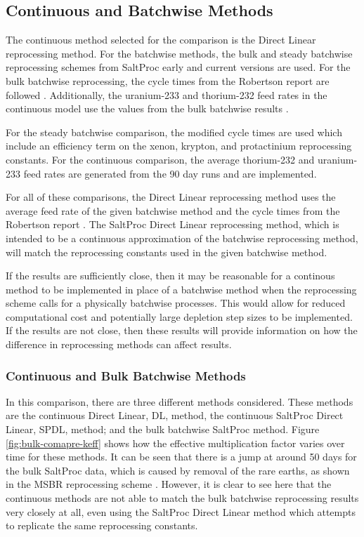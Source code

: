 \subsection{Continuous and Batchwise Methods}

The continuous method selected for the comparison is the Direct Linear reprocessing method. For the batchwise methods, the bulk and steady batchwise reprocessing schemes from SaltProc early and current versions are used. For the bulk batchwise reprocessing, the cycle times from the Robertson report are followed \cite{robertson_conceptual_1971}. Additionally, the uranium-233 and thorium-232 feed rates in the continuous model use the values from the bulk batchwise results \cite{rykhlevskii_advanced_2018}.

For the steady batchwise comparison, the modified cycle times are used which include an efficiency term on the xenon, krypton, and protactinium reprocessing constants. For the continuous comparison, the average thorium-232 and uranium-233 feed rates are generated from the 90 day runs and are implemented.

For all of these comparisons, the Direct Linear reprocessing method uses the average feed rate of the given batchwise method and the cycle times from the Robertson report \cite{robertson_conceptual_1971}. The SaltProc Direct Linear reprocessing method, which is intended to be a continuous approximation of the batchwise reprocessing method, will match the reprocessing constants used in the given batchwise method.

If the results are sufficiently close, then it may be reasonable for a continous method to be implemented in place of a batchwise method when the reprocessing scheme calls for a physically batchwise processes. This would allow for reduced computational cost and potentially large depletion step sizes to be implemented. If the results are not close, then these results will provide information on how the difference in reprocessing methods can affect results.


\subsubsection{Continuous and Bulk Batchwise Methods}

In this comparison, there are three different methods considered. These methods are the continuous Direct Linear, DL, method, the continuous SaltProc Direct Linear, SPDL, method; and the bulk batchwise SaltProc method. Figure \ref{fig:bulk-comapre-keff} shows how the effective multiplication factor varies over time for these methods. It can be seen that there is a jump at around 50 days for the bulk SaltProc data, which is caused by removal of the rare earths, as shown in the MSBR reprocessing scheme \cite{robertson_conceptual_1971}. However, it is clear to see here that the continuous methods are not able to match the bulk batchwise reprocessing results very closely at all, even using the SaltProc Direct Linear method which attempts to replicate the same reprocessing constants.

